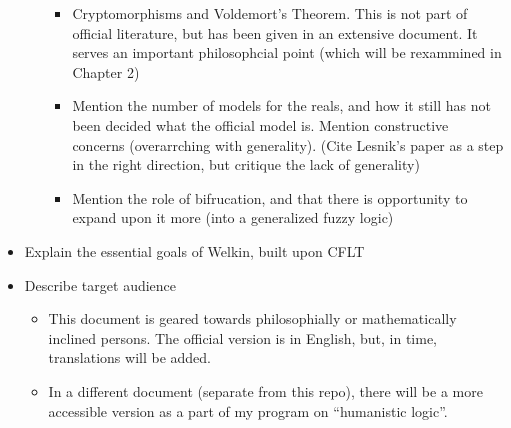 \begin{itemize}
\begin{itemize}
                \begin{itemize}
                  \item Cryptomorphisms and Voldemort's Theorem. This is not part of official literature, but has been given in an extensive document. It serves an important philosophcial point (which will be rexammined in Chapter 2)
                  \item Mention the number of models for the reals, and how it still has not been decided what the official model is. Mention constructive concerns (overarrching with generality). (Cite Lesnik's paper as a step in the right direction, but critique the lack of generality)
                  \item Mention the role of bifrucation, and that there is opportunity to expand upon it more (into a generalized fuzzy logic)
                \end{itemize}
  \end{itemize}
  \item Explain the essential goals of Welkin, built upon CFLT
  \item Describe target audience
  \begin{itemize}
    \item This document is geared towards philosophially or mathematically inclined persons. The official version is in English, but, in time, translations will be added.
    \item In a different document (separate from this repo), there will be a more accessible version as a part of my program on ``humanistic logic''.
  \end{itemize}
\end{itemize}
